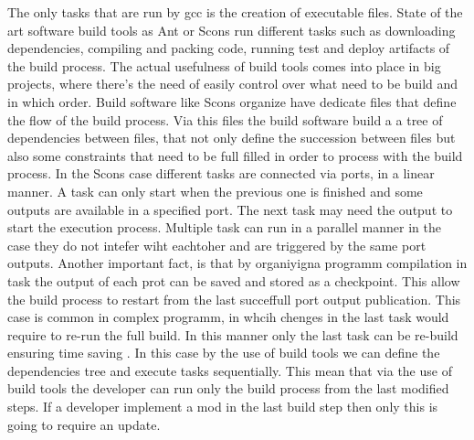 \documentclass[../main.tex]{subfiles}
\begin{document}
The only tasks that are run by gcc is the creation of executable files. State of the art software build tools as Ant or Scons run different tasks such as downloading dependencies, compiling and packing code, running test and deploy artifacts of the build process. The actual usefulness of build tools comes into place in big projects, where there's the need of easily control over what need to be build and in which order. Build software like Scons organize have dedicate files that define the flow of the build process. Via this files the build software build a a tree of dependencies between files, that not only define the succession between files but also some constraints that need to be full filled in order to process with the build process. In the Scons case different tasks are connected via ports, in a linear manner. A task can only start when the previous one is finished and some outputs are available in a specified port. The next task may need the output to start the execution process. Multiple task can run in a parallel manner in the case they do not intefer wiht eachtoher and are triggered by the same port outputs. Another important fact, is that by organiyigna programm compilation in task the output of each prot can be saved and stored as a checkpoint. This allow the build process to restart from the last succeffull port output publication. This case is common in complex programm, in whcih chenges in the last task would require to re-run the full build. In this manner only the last task can be re-build ensuring time saving . In this case by the use of build tools we can define the dependencies tree and execute tasks sequentially. This mean that via the use of build tools the developer can run only the build process from the last modified steps. If a developer implement a mod in the last build step then only this is going to require an update. 
\end{document}
